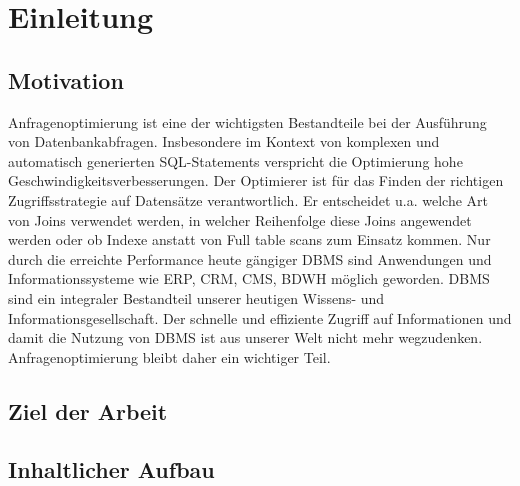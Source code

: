 \chapter{Einleitung}

\section{Motivation}
Anfragenoptimierung ist eine der wichtigsten Bestandteile bei der Ausführung von Datenbankabfragen. Insbesondere im Kontext von komplexen und automatisch generierten SQL-Statements verspricht die Optimierung hohe Geschwindigkeitsverbesserungen. Der Optimierer ist für das Finden der richtigen Zugriffsstrategie auf Datensätze verantwortlich. Er entscheidet u.a. welche Art von Joins verwendet werden, in welcher Reihenfolge diese Joins angewendet werden oder ob Indexe anstatt von Full table scans zum Einsatz kommen. Nur durch die erreichte Performance heute gängiger \ac{DBMS} sind Anwendungen und Informationssysteme wie \ac{ERP}, \ac{CRM}, \ac{CMS}, \ac{BDWH} möglich geworden. \ac{DBMS} sind ein integraler Bestandteil unserer heutigen Wissens- und Informationsgesellschaft. Der schnelle und effiziente Zugriff auf Informationen und damit die Nutzung von \ac{DBMS} ist aus unserer Welt nicht mehr wegzudenken. Anfragenoptimierung bleibt daher ein wichtiger Teil.




\section{Ziel der Arbeit}

\section{Inhaltlicher Aufbau}
